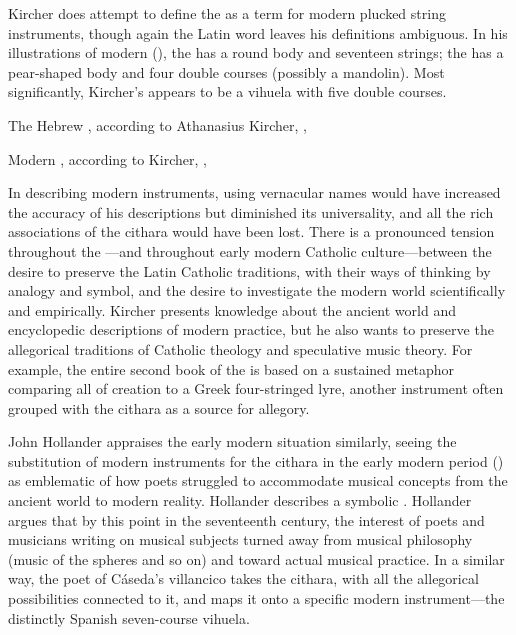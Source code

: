 
Kircher does attempt to define the  as a term for modern
plucked string instruments, though again the Latin word leaves his definitions
ambiguous.
In his illustrations of modern 
(), the  has a round body and
seventeen strings; the  has a pear-shaped
body and four double courses (possibly a mandolin).
Most significantly, Kircher's  appears to be a vihuela
with five double courses.

{The Hebrew , according to Athanasius Kircher, , }


{Modern , according to Kircher, ,
}

In describing modern instruments, using vernacular names would have increased
the accuracy of his descriptions but diminished its universality, and all the
rich associations of the cithara would have been lost.
There is a pronounced tension throughout the ---and throughout
early modern Catholic culture---between the desire to preserve the Latin
Catholic traditions, with their ways of thinking by analogy and symbol, and the
desire to investigate the modern world scientifically and empirically.
Kircher presents  knowledge about the ancient world and
encyclopedic descriptions of modern practice, but he also wants to preserve the
allegorical traditions of Catholic theology and speculative music theory.
For example, the entire second book of the  is based on a
sustained metaphor comparing all of creation to a Greek four-stringed lyre,
another instrument often grouped with the cithara as a source for allegory.

John Hollander appraises the early modern situation similarly, seeing the
substitution of modern instruments for the cithara in the early modern period
() as emblematic of how poets struggled to accommodate
musical concepts from the ancient world to modern reality.
Hollander describes a symbolic .%
    \Autocite[44--51]{Hollander:Untuning}
Hollander argues that by this point in the seventeenth century, the interest of
poets and musicians writing on musical subjects turned away from musical
philosophy (music of the spheres and so on) and toward actual musical practice. 
In a similar way, the poet of Cáseda's villancico takes the cithara, with all
the allegorical possibilities connected to it, and maps it onto a specific
modern instrument---the distinctly Spanish seven-course vihuela.


